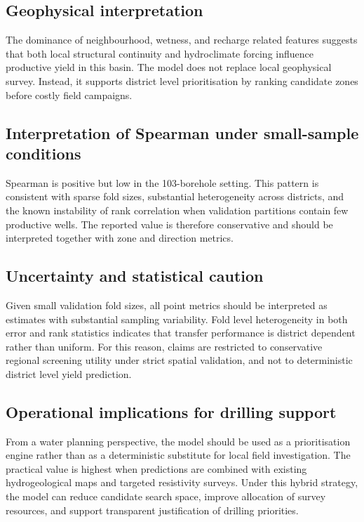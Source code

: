 \documentclass[preprint,12pt]{elsarticle}
\begin{document}
\subsection{Geophysical interpretation}
The dominance of neighbourhood, wetness, and recharge related features suggests that both local structural continuity and hydroclimate forcing influence productive yield in this basin. The model does not replace local geophysical survey. Instead, it supports district level prioritisation by ranking candidate zones before costly field campaigns.

\subsection{Interpretation of Spearman under small-sample conditions}
Spearman is positive but low in the 103-borehole setting. This pattern is consistent with sparse fold sizes, substantial heterogeneity across districts, and the known instability of rank correlation when validation partitions contain few productive wells. The reported value is therefore conservative and should be interpreted together with zone and direction metrics.

\subsection{Uncertainty and statistical caution}
Given small validation fold sizes, all point metrics should be interpreted as estimates with substantial sampling variability. Fold level heterogeneity in both error and rank statistics indicates that transfer performance is district dependent rather than uniform. For this reason, claims are restricted to conservative regional screening utility under strict spatial validation, and not to deterministic district level yield prediction.

\subsection{Operational implications for drilling support}
From a water planning perspective, the model should be used as a prioritisation engine rather than as a deterministic substitute for local field investigation. The practical value is highest when predictions are combined with existing hydrogeological maps and targeted resistivity surveys. Under this hybrid strategy, the model can reduce candidate search space, improve allocation of survey resources, and support transparent justification of drilling priorities.
\end{document}
